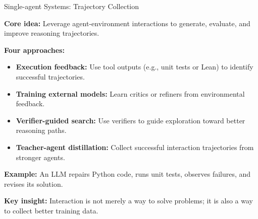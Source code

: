 \documentclass[aspectratio=169]{beamer}
\begin{document}
\begin{frame}{Single-agent Systems: Trajectory Collection}

\textbf{Core idea:} Leverage agent-environment interactions to generate, evaluate, and improve reasoning trajectories.

\vspace{0.3cm}

\textbf{Four approaches:}
\begin{itemize}
    \item \textbf{Execution feedback:}
    Use tool outputs (e.g., unit tests or Lean) to identify successful trajectories.

    \item \textbf{Training external models:}
    Learn critics or refiners from environmental feedback.

    \item \textbf{Verifier-guided search:}
    Use verifiers to guide exploration toward better reasoning paths.

    \item \textbf{Teacher-agent distillation:}
    Collect successful interaction trajectories from stronger agents.
\end{itemize}

\vspace{0.3cm}

\textbf{Example:} An LLM repairs Python code, runs unit tests, observes failures, and revises its solution.

\vspace{0.2cm}

\textbf{Key insight:} Interaction is not merely a way to solve problems; it is also a way to collect better training data.

\end{frame}
\end{document}
